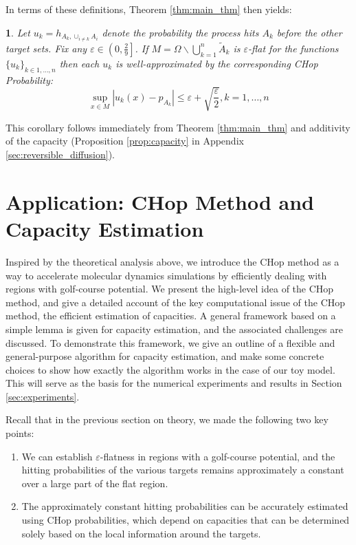 \documentclass[english, aip, jcp, priprint, graphicx,floatfix]{revtex4-1}
\theoremstyle{plain}
\theoremstyle{definition}
\theoremstyle{plain}
\newtheorem{cor}[thm]{\protect\corollaryname}
\providecommand{\corollaryname}{Corollary}
\begin{document}
In terms of these definitions, Theorem \ref{thm:main_thm} then yields:

\begin{cor}\label{thm:main_cor} Let $u_k = h_{A_k,\cup_{i\neq k} A_i}$ denote the probability the process hits $A_k$ before the other target sets.  Fix any $\varepsilon \in \left( 0, \frac{2}{9} \right]$.  If $M = \Omega \backslash \bigcup_{k = 1}^n \tilde{A}_k $ is $\varepsilon$-flat for the functions $\{u_k\}_{k\in1,\dots, n}$ then each $u_k$ is well-approximated by the corresponding CHop Probability:
\[ \sup_{x \in M} \left| u_k (x) - p_{A_k} \right| \leqslant \varepsilon + \sqrt{\frac{\varepsilon}{2}}, k=1,\dots, n\]
\end{cor}

This corollary follows immediately from Theorem \ref{thm:main_thm} and additivity of the capacity (Proposition \ref{prop:capacity} in Appendix \ref{sec:reversible_diffusion}). 

\section{Application: CHop Method and Capacity Estimation}\label{sec:algorithm}

Inspired by the theoretical analysis above, we introduce the CHop method as a way to accelerate molecular dynamics simulations by efficiently dealing with regions with golf-course potential. We present the high-level idea of the CHop method, and give a detailed account of the key computational issue of the CHop method, the efficient estimation of capacities. A general framework based on a simple lemma is given for capacity estimation, and the associated challenges are discussed. To demonstrate this framework, we give an outline of a flexible and general-purpose algorithm for capacity estimation, and make some concrete choices to show how exactly the algorithm works in the case of our toy model. This will serve as the basis for the numerical experiments and results in Section \ref{sec:experiments}.

Recall that in the previous section on theory, we made the following two key points:

\begin{enumerate}
	\item We can establish $\varepsilon$-flatness in regions with a golf-course potential, and the hitting probabilities of the various targets remains approximately a constant over a large part of the flat region.
	\item The approximately constant hitting probabilities can be accurately estimated using CHop probabilities, which depend on capacities that can be determined solely based on the local information around the targets.
\end{enumerate}
\end{document}
